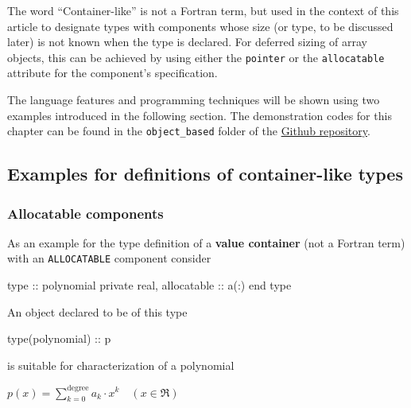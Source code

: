 \documentclass[
  paper=a4,
  ,captions=tableheading
]{scrartcl}
\newenvironment{Shaded}{\begin{snugshade}}{\end{snugshade}}
\newcommand{\DataTypeTok}[1]{\textcolor[rgb]{0.13,0.29,0.53}{#1}}
\newcommand{\NormalTok}[1]{#1}
\begin{document}
The word ``Container-like'' is not a Fortran term, but used in the
context of this article to designate types with components whose size
(or type, to be discussed later) is not known when the type is declared.
For deferred sizing of array objects, this can be achieved by using
either the \texttt{pointer} or the \texttt{allocatable} attribute for
the component's specification.

The language features and programming techniques will be shown using two
examples introduced in the following section. The demonstration codes
for this chapter can be found in the \texttt{object\_based} folder of
the \href{https://github.com/reinh-bader/object_fortran}{Github
repository}.

\subsection{Examples for definitions of container-like
types}\label{examples-for-definitions-of-container-like-types}

\subsubsection{Allocatable components}\label{allocatable-components}

As an example for the type definition of a \textbf{value container} (not
a Fortran term) with an \texttt{ALLOCATABLE} component consider

\begin{Shaded}
\begin{Highlighting}[]
\DataTypeTok{type} \DataTypeTok{::}\NormalTok{ polynomial}
  \DataTypeTok{private}
  \DataTypeTok{real}\NormalTok{, }\DataTypeTok{allocatable} \DataTypeTok{::}\NormalTok{ a(:)}
\DataTypeTok{end type}
\end{Highlighting}
\end{Shaded}

An object declared to be of this type

\begin{Shaded}
\begin{Highlighting}[]
\DataTypeTok{type(polynomial)} \DataTypeTok{::}\NormalTok{ p}
\end{Highlighting}
\end{Shaded}

is suitable for characterization of a polynomial

\(p(x) = \sum_{k=0}^{\text{degree}} a_{k} \cdot x^k \quad (x \in \Re)\)
\end{document}
